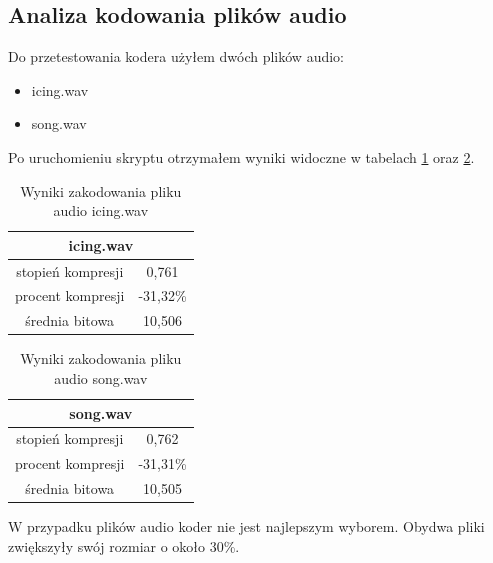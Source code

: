 \documentclass[12pt]{article}
\begin{document}
\subsection{Analiza kodowania plików audio}
Do przetestowania kodera użyłem dwóch plików audio:
\begin{itemize}
  \item icing.wav
  \item song.wav
\end{itemize}
Po uruchomieniu skryptu otrzymałem wyniki widoczne w tabelach \ref{audio:1} oraz \ref{audio:2}.
\begin{table}[ht!]
  \centering
  \begin{tabular}{|c|c|}
    \hline
    \multicolumn{2}{|c|}{icing.wav} \\
    \hline
    \hline
    stopień kompresji & 0,761\\
    procent kompresji & -31,32\%\\
    średnia bitowa & 10,506 \\
    \hline
  \end{tabular}
  \caption{Wyniki zakodowania pliku audio icing.wav}
  \label{audio:1}
\end{table}
\begin{table}[ht!]
  \centering
  \begin{tabular}{|c|c|}
    \hline
    \multicolumn{2}{|c|}{song.wav} \\
    \hline
    \hline
    stopień kompresji & 0,762\\
    procent kompresji & -31,31\%\\
    średnia bitowa & 10,505 \\
    \hline
  \end{tabular}
  \caption{Wyniki zakodowania pliku audio song.wav}
  \label{audio:2}
\end{table}

W przypadku plików audio koder nie jest najlepszym wyborem.
Obydwa pliki zwiększyły swój rozmiar o około 30\%. 
\end{document}
